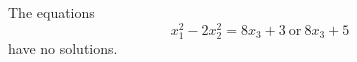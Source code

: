 \begin{proposition}\label{eq:029}
    The equations
\[
    x_1^2-2x_2^2=8x_3+3\ \text{or}\ 8x_3+5
\]
    have no solutions.
\end{proposition}

